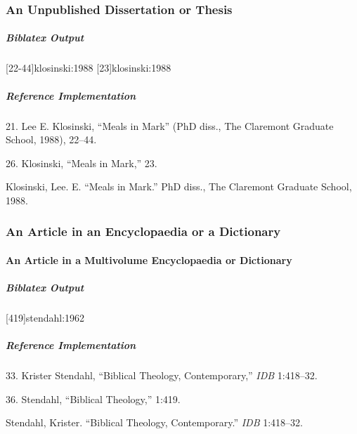 \documentclass[a4paper]{article}
\newenvironment{biboutput}{%
  \subparagraph{Biblatex Output}
}{\color{black}}
\newenvironment{refimp}{%
  \subparagraph{Reference Implementation}
  \color{reference-colour}
  \rm
}{\par\color{black}}
\begin{document}
\subsubsection{An Unpublished Dissertation or Thesis}

\begin{biboutput}
  [22-44]{klosinski:1988}
  [23]{klosinski:1988}
\end{biboutput}

\begin{refimp}
  \hspace*{\bibindent}21. Lee E. Klosinski, “Meals in Mark” (PhD diss., The
  Claremont Graduate School, 1988), 22–44.

  \hspace*{\bibindent}26. Klosinski, “Meals in Mark,” 23.

  \hangindent\bibindent Klosinski, Lee. E. “Meals in Mark.” PhD diss., The
  Claremont Graduate School, 1988.
\end{refimp}

\subsubsection{An Article in an Encyclopaedia or a Dictionary}

\paragraph{An Article in a Multivolume Encyclopaedia or Dictionary}

\begin{biboutput}
  [419]{stendahl:1962}
  \toggletrue{fullbibrefs}
  \togglefalse{fullbibrefs}
\end{biboutput}

\begin{refimp}
  \hspace*{\bibindent}33. Krister Stendahl, “Biblical Theology, Contemporary,”
  \emph{IDB} 1:418–32.
  
  \hspace*{\bibindent}36. Stendahl, “Biblical Theology,” 1:419.
  
  Stendahl, Krister. “Biblical Theology, Contemporary.” \emph{IDB} 1:418–32.

\end{refimp}
\end{document}
